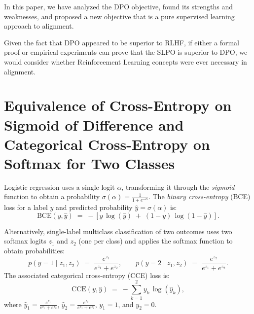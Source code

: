 \documentclass[twoside,11pt]{article}
\begin{document}
In this paper, we have analyzed the DPO objective, found 
its strengths and weaknesses, and proposed a new objective
that is a pure supervised learning approach to alignment.

Given the fact that DPO appeared to be superior to RLHF, if
either a formal proof or empirical experiments can prove that 
the SLPO is superior to DPO, we would consider whether
Reinforcement Learning concepts were ever necessary in alignment. 




\newpage

\appendix



\section{Equivalence of Cross-Entropy on Sigmoid of Difference
and Categorical Cross-Entropy on Softmax for Two Classes}

\label{app:ce-of-diff-same-as-softmax}

Logistic regression uses 
a single logit \(\alpha\), transforming it through the \emph{sigmoid} function to obtain 
a probability \(\sigma(\alpha) = \frac{1}{1 + e^{-\alpha}} \). The \emph{binary cross-entropy} 
(BCE) loss for a label $y$ and predicted probability \(\hat{y} = \sigma(\alpha)\) is:
\[
  \text{BCE}(y, \hat{y})
  \;=\;
  - \left[
      y \,\log(\hat{y})
      \;+\;
      (1 - y)\,\log (1 - \hat{y})
    \right].
\]

Alternatively, single-label multiclass classification of two 
outcomes uses two softmax logits \(z_1\) and \(z_2\) (one per class) 
and applies the softmax function to obtain probabilities:
\[
  p(y=1 \mid z_1, z_2)
  \;=\;
  \frac{e^{z_1}}{e^{z_1} + e^{z_2}},
  \qquad
  p(y=2 \mid z_1, z_2)
  \;=\;
  \frac{e^{z_2}}{e^{z_1} + e^{z_2}}.
\]
The associated categorical cross-entropy (CCE) loss is: 
\[
  \text{CCE}(y, \hat{y})
  \;=\;
  -\sum_{k=1}^2 y_k \,\log (\hat{y}_k ),
\]
where \(\hat{y}_1 = \frac{e^{z_1}}{e^{z_1} + e^{z_2}}\), 
\(\hat{y}_2 = \frac{e^{z_2}}{e^{z_1} + e^{z_2}}\), 
\(y_1 = 1\), and
\(y_2 = 0\). 
\end{document}
